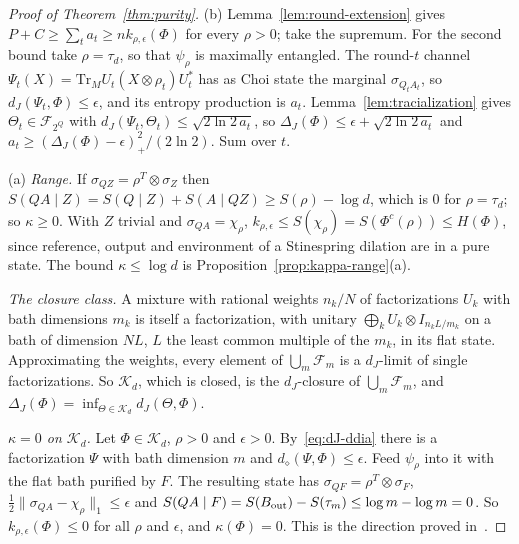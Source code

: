 \documentclass[11pt,a4paper]{article}
\theoremstyle{plain}
\theoremstyle{definition}
\theoremstyle{remark}
\newcommand{\dJ}{d_J}
\newcommand{\ddia}{d_\diamond}
\begin{document}
\begin{proof}[Proof of Theorem~\ref{thm:purity}]
(b) Lemma~\ref{lem:round-extension} gives $P+C\ge\sum_ta_t\ge nk_{\rho,\epsilon}(\Phi)$ for every $\rho>0$; take the supremum. For the second bound take
$\rho=\tau_d$, so that $\psi_\rho$ is maximally entangled. The round-$t$ channel $\Psi_t(X)=\mathrm{Tr}_MU_t(X\otimes\rho_t)U_t^*$ has as Choi state the marginal
$\sigma_{Q_tA_t}$, so $\dJ(\Psi_t,\Phi)\le\epsilon$, and its entropy production is $a_t$. Lemma~\ref{lem:tracialization} gives $\Theta_t\in\mathcal F_{2^Q}$
with $\dJ(\Psi_t,\Theta_t)\le\sqrt{2\ln2\,a_t}$, so $\Delta_J(\Phi)\le\epsilon+\sqrt{2\ln2\,a_t}$ and $a_t\ge(\Delta_J(\Phi)-\epsilon)_+^2/(2\ln2)$. Sum over $t$.

(a) \emph{Range.} If $\sigma_{QZ}=\rho^T\otimes\sigma_Z$ then $S(QA\mid Z)=S(Q\mid Z)+S(A\mid QZ)\ge S(\rho)-\log d$, which is $0$ for $\rho=\tau_d$; so
$\kappa\ge0$. With $Z$ trivial and $\sigma_{QA}=\chi_\rho$, $k_{\rho,\epsilon}\le S(\chi_\rho)=S(\Phi^c(\rho))\le H(\Phi)$, since reference, output and
environment of a Stinespring dilation are in a pure state. The bound $\kappa\le\log d$ is Proposition~\ref{prop:kappa-range}(a).

\emph{The closure class.} A mixture with rational weights $n_k/N$ of factorizations $U_k$ with bath dimensions $m_k$ is itself a factorization,
with unitary $\bigoplus_kU_k\otimes I_{n_kL/m_k}$ on a bath of dimension $NL$, $L$ the least common multiple of the $m_k$, in its flat state.
Approximating the weights, every element of $\bigcup_m\mathcal F_m$ is a $\dJ$-limit of single factorizations. So $\mathcal K_d$, which is closed,
is the $\dJ$-closure of $\bigcup_m\mathcal F_m$, and $\Delta_J(\Phi)=\inf_{\Theta\in\mathcal K_d}\dJ(\Theta,\Phi)$.

\emph{$\kappa=0$ on $\mathcal K_d$.} Let $\Phi\in\mathcal K_d$, $\rho>0$ and $\epsilon>0$. By~\eqref{eq:dJ-ddia} there is a factorization $\Psi$ with bath
dimension $m$ and $\ddia(\Psi,\Phi)\le\epsilon$. Feed $\psi_\rho$ into it with the flat bath purified by $F$. The resulting state has
$\sigma_{QF}=\rho^T\otimes\sigma_F$, $\frac12\|\sigma_{QA}-\chi_\rho\|_1\le\epsilon$ and $S(QA\mid F)=S(B_{\rm out})-S(\tau_m)\le\log m-\log m=0$. So
$k_{\rho,\epsilon}(\Phi)\le0$ for all $\rho$ and $\epsilon$, and $\kappa(\Phi)=0$. This is the direction proved in~\cite{Douglas2026closed}.


\end{proof}
\end{document}
